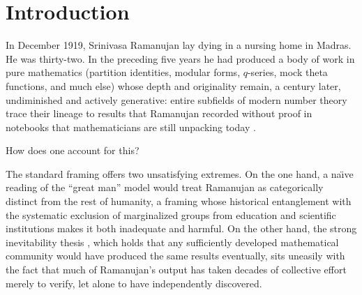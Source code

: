 \documentclass{article}
\begin{document}
\begin{abstract}
same distribution as everyone else, and, under its full-restart assumption, makes their irreplaceability quantitative and practical: modest reliability differences can separate completion probabilities so widely that, within a specified population and time budget, additional lower-reliability workers provide negligible compensation for losing a higher-reliability one.
\end{abstract}

\section{Introduction}\label{sec:intro}

In December 1919, Srinivasa Ramanujan lay dying in a nursing home in
Madras. He was thirty-two. In the preceding five years he had produced a
body of work in pure mathematics (partition identities, modular forms,
$q$-series, mock theta functions, and much else) whose depth and
originality remain, a century later, undiminished and actively
generative: entire subfields of modern number theory trace their lineage
to results that Ramanujan recorded without proof in notebooks that
mathematicians are still unpacking today
\cite{hardy1940ramanujan,kanigel1991man}.

How does one account for this?

The standard framing offers two unsatisfying extremes. On the one hand, a
na\"{\i}ve reading of the ``great man'' model \cite{hook2004great} would treat Ramanujan as
categorically distinct from the rest of humanity, a framing whose
historical entanglement with the systematic exclusion of marginalized
groups from education and scientific institutions makes it both
inadequate and harmful. On the other hand, the strong
inevitability thesis \cite{kuhn1970structure}, which holds that any sufficiently developed mathematical
community would have produced the same results eventually, sits uneasily
with the fact that much of Ramanujan's output has taken decades of
collective effort merely to verify, let alone to have independently
discovered.
\end{document}
